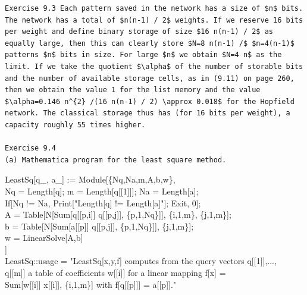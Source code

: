 \documentclass[10pt]{book}
\begin{document}
\begin{verbatim}
Exercise 9.3 Each pattern saved in the network has a size of $n$ bits. The network has a total of $n(n-1) / 2$ weights. If we reserve 16 bits per weight and define binary storage of size $16 n(n-1) / 2$ as equally large, then this can clearly store $N=8 n(n-1) /$ $n=4(n-1)$ patterns $n$ bits in size. For large $n$ we obtain $N=4 n$ as the limit. If we take the quotient $\alpha$ of the number of storable bits and the number of available storage cells, as in (9.11) on page 260, then we obtain the value 1 for the list memory and the value $\alpha=0.146 n^{2} /(16 n(n-1) / 2) \approx 0.018$ for the Hopfield network. The classical storage thus has (for 16 bits per weight), a capacity roughly 55 times higher.

Exercise 9.4
(a) Mathematica program for the least square method.
\end{verbatim}


LeastSq[q\_, a\_] := Module[\{Nq,Na,m,A,b,w\},\\[0pt]
Nq = Length[q]; m = Length[q[[1]]]; Na = Length[a];\\[0pt]
If[Nq != Na, Print["Length[q] != Length[a]"]; Exit, 0];\\[0pt]
A = Table[N[Sum[q[[p,i]] q[[p,j]], \{p,1,Nq\}]], \{i,1,m\}, \{j,1,m\}];\\[0pt]
b = Table[N[Sum[a[[p]] q[[p,j]], \{p,1,Nq\}]], \{j,1,m\}];\\[0pt]
w = LinearSolve[A,b]\\[0pt]
]\\[0pt]
LeastSq::usage = "LeastSq[x,y,f] computes from the query vectors q[[1]],...,\\[0pt]
q[[m]] a table of coefficients w[[i]] for a linear mapping f[x] =\\[0pt]
Sum[w[[i]] x[[i]], \{i,1,m\}] with f[q[[p]]] = a[[p]]."
\end{document}
